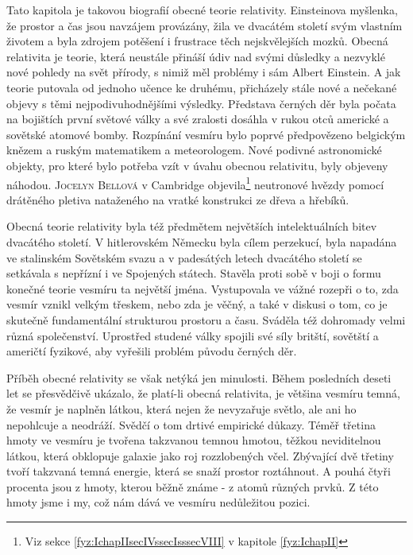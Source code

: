   Tato kapitola je takovou biografií obecné teorie relativity. Einsteinova myšlenka, že prostor a
  čas jsou navzájem provázány, žila ve dvacátém století svým vlastním životem a byla zdrojem
  potěšení i frustrace těch nejskvělejších mozků. Obecná relativita je teorie, která neustále
  přináší údiv nad svými důsledky a nezvyklé nové pohledy na svět přírody, s nimiž měl problémy i
  sám Albert Einstein. A jak teorie putovala od jednoho učence ke druhému, přicházely stále nové a
  nečekané objevy s těmi nejpodivuhodnějšími výsledky. Představa černých děr byla počata na
  bojištích první světové války a své zralosti dosáhla v rukou otců americké a sovětské atomové
  bomby. Rozpínání vesmíru bylo poprvé předpovězeno belgickým knězem a ruským matematikem a
  meteorologem. Nové podivné astronomické objekty, pro které bylo potřeba vzít v úvahu obecnou
  relativitu, byly objeveny náhodou. \textsc{Jocelyn Bellová} v Cambridge objevila\footnote{Viz
  sekce \ref{fyz:IchapIIsecIVssecIsssecVIII} v kapitole \ref{fyz:IchapII}} neutronové hvězdy pomocí
  drátěného pletiva nataženého na vratké konstrukci ze dřeva a hřebíků. 


  Obecná teorie relativity byla též předmětem největších intelektuálních bitev dvacátého století. V
  hitlerovském Německu byla cílem perzekucí, byla napadána ve stalinském Sovětském svazu a v
  padesátých letech dvacátého století se setkávala s nepřízní i ve Spojených státech. Stavěla proti
  sobě v boji o formu konečné teorie vesmíru ta největší jména. Vystupovala ve vážné rozepři o to,
  zda vesmír vznikl velkým třeskem, nebo zda je věčný, a také v diskusi o tom, co je skutečně
  fundamentální strukturou prostoru a času. Sváděla též dohromady velmi různá společenství.
  Uprostřed studené války spojili své síly britští, sovětští a američtí fyzikové, aby vyřešili
  problém původu černých děr. 

  Příběh obecné relativity se však netýká jen minulosti. Během posledních deseti let se přesvědčivě
  ukázalo, že platí-li obecná relativita, je většina vesmíru temná, že vesmír je naplněn látkou,
  která nejen že nevyzařuje světlo, ale ani ho nepohlcuje a neodráží. Svědčí o tom drtivé empirické
  důkazy. Téměř třetina hmoty ve vesmíru je tvořena takzvanou temnou hmotou, těžkou neviditelnou
  látkou, která obklopuje galaxie jako roj rozzlobených včel. Zbývající dvě třetiny tvoří takzvaná
  temná energie, která se snaží prostor roztáhnout. A pouhá čtyři procenta jsou z hmoty, kterou
  běžně známe - z atomů různých prvků. Z této hmoty jsme i my, což nám dává ve vesmíru nedůležitou
  pozici. 

